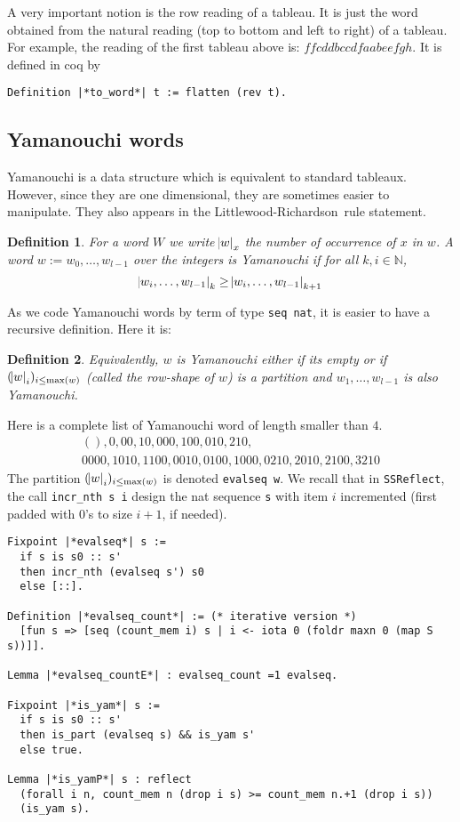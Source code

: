 \documentclass[12pt,a4paper]{article}
\newcommand{\SSR}{\texttt{SSReflect}\xspace}
\newcommand{\LR}{Littlewood-Richardson\ }
\newcommand{\N}{{\mathbb N}}
\newtheorem{DEFN}{Definition}
\begin{document}
A very important notion is the row reading of a tableau. It is just the word
obtained from the natural reading (top to bottom and left to right) of a
tableau. For example, the reading of the first tableau above is:
$ffcddbccdfaabeefgh$.
It is defined in coq by
\begin{lstlisting}
Definition |*to_word*| t := flatten (rev t).
\end{lstlisting}

\subsection{Yamanouchi words}

Yamanouchi is a data structure which is equivalent to standard
tableaux. However, since they are one dimensional, they are sometimes easier
to manipulate. They also appears in the \LR rule statement.

\begin{DEFN}
  For a word $W$ we write $\abs{w}_x$ the number of occurrence of $x$ in $w$.
  A word $w := w_0,\dots,w_{l-1}$ over the integers is \emph{Yamanouchi} if for
  all $k, i \in \N$,
  \[ \abs{w_i,\dots,w_{l-1}}_k \geq \abs{w_i,\dots,w_{l-1}}_{k+1} \]
\end{DEFN}
As we code Yamanouchi words by term of type \lstinline{seq nat}, it is easier
to have a recursive definition. Here it is:
\begin{DEFN}
  Equivalently, $w$ is \emph{Yamanouchi} either if its empty or if
  $(\abs{w}_i)_{i\leq\max(w)}$ (called the row-shape of $w$) is a partition
  and $w_1,\dots,w_{l-1}$ is also Yamanouchi.
\end{DEFN}
Here is a complete list of Yamanouchi word of length smaller than $4$.
\begin{gather}
  (), 0, 00, 10, 000, 100, 010, 210, \\
  0000, 1010, 1100, 0010, 0100, 1000, 0210, 2010, 2100, 3210
\end{gather}
The partition $(\abs{w}_i)_{i\leq\max(w)}$ is denoted \lstinline|evalseq w|.
 We recall that in \SSR, the call \lstinline{incr_nth s i} design the nat
sequence \lstinline|s| with item $i$ incremented (first padded with 0's to
size $i+1$, if needed).

  \begin{lstlisting}
Fixpoint |*evalseq*| s :=
  if s is s0 :: s'
  then incr_nth (evalseq s') s0
  else [::].

Definition |*evalseq_count*| := (* iterative version *)
  [fun s => [seq (count_mem i) s | i <- iota 0 (foldr maxn 0 (map S s))]].

Lemma |*evalseq_countE*| : evalseq_count =1 evalseq.

Fixpoint |*is_yam*| s :=
  if s is s0 :: s'
  then is_part (evalseq s) && is_yam s'
  else true.

Lemma |*is_yamP*| s : reflect
  (forall i n, count_mem n (drop i s) >= count_mem n.+1 (drop i s))
  (is_yam s).
\end{lstlisting}
\end{document}
